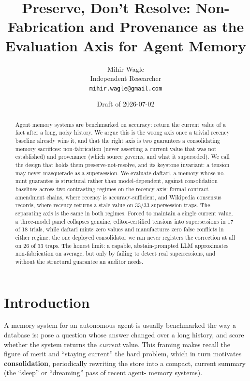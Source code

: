 \documentclass[11pt]{article}
\title{Preserve, Don't Resolve: Non-Fabrication and Provenance as the Evaluation Axis for Agent Memory}
\author{Mihir Wagle \\ Independent Researcher \\ \texttt{mihir.wagle@gmail.com}}
\date{Draft of 2026-07-02}
\begin{document}
\maketitle

\begin{abstract}
Agent memory systems are benchmarked on accuracy: return the current value of a fact after
a long, noisy history. We argue this is the wrong axis once a trivial recency baseline
already wins it, and that the right axis is two guarantees a consolidating memory
sacrifices: non-fabrication (never asserting a current value that was not established) and
provenance (which source governs, and what it superseded). We call the design that holds
them preserve-not-resolve, and its keystone invariant: a tension may never masquerade as a
supersession. We evaluate daftari, a memory whose no-mint guarantee is structural rather
than model-dependent, against consolidation baselines across two contrasting regimes on
the recency axis: formal contract amendment chains, where recency is accuracy-sufficient,
and Wikipedia consensus records, where recency returns a stale value on 33/33 supersession
traps. The separating axis is the same in both regimes. Forced to maintain a single
current value, a three-model panel collapses genuine, editor-certified tensions into
supersessions in 17 of 18 trials, while daftari mints zero values and manufactures zero
false conflicts in either regime; the one deployed consolidator we ran never registers the
correction at all on 26 of 33 traps. The honest limit: a capable, abstain-prompted LLM
approximates non-fabrication on average, but only by failing to detect real supersessions,
and without the structural guarantee an auditor needs.
\end{abstract}

\section{Introduction}
\label{sec:introduction}

A memory system for an autonomous agent is usually benchmarked the way a database is: pose
a question whose answer changed over a long history, and score whether the system returns
the \emph{current} value. This framing makes recall the figure of merit and ``staying current''
the hard problem, which in turn motivates \textbf{consolidation}, periodically rewriting the
store into a compact, current summary (the ``sleep'' or ``dreaming'' pass of recent agent-
memory systems).
\end{document}
